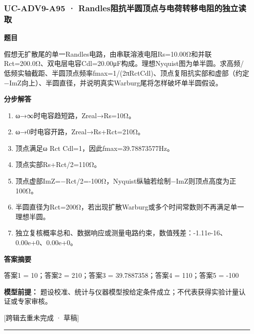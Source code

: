 \documentclass[UTF8,11pt,a4paper]{ctexart}
\begin{document}
\subsubsection*{UC-ADV9-A95 · Randles阻抗半圆顶点与电荷转移电阻的独立读取}
\noindent\textbf{题目}\par
假想无扩散尾的单一Randles电路，由串联溶液电阻Rs=10.00Ω和并联Rct=200.0Ω、双电层电容Cdl=20.00μF构成。理想Nyquist图为单半圆。求高频/低频实轴截距、半圆顶点频率fmax=1/(2πRctCdl)、顶点复阻抗实部和虚部（约定−ImZ向上）、半圆直径，并说明真实Warburg尾将怎样破坏单半圆假设。\par
\medskip\noindent\textbf{分步解答}
\begin{enumerate}
\item ω→∞时电容趋短路，Zreal→Rs=10Ω。
\item ω→0时电容开路，Zreal→Rs+Rct=210Ω。
\item 顶点满足ω Rct Cdl=1，因此fmax=39.78873577Hz。
\item 顶点实部Rs+Rct/2=110Ω。
\item 顶点虚部ImZ=−Rct/2=-100Ω，Nyquist纵轴若绘制−ImZ则顶点高度为正100Ω。
\item 半圆直径为Rct=200Ω，若出现扩散Warburg或多个时间常数则不再满足单一理想半圆。
\item 独立复核概率总和、数据响应或测量电路约束，数值残差：-1.11e-16、0.00e+0、0.00e+0。
\end{enumerate}
\noindent\textbf{答案摘要}\par
答案1 = 10；答案2 = 210；答案3 = 39.7887358；答案4 = 110；答案5 = -100\par
\noindent\textbf{模型前提：}
题设校准、统计与仪器模型按给定条件成立；不代表获得实验计量认证或专家审核。\par
\noindent\textcolor{red!65!black}{[跨辑去重未完成 · 草稿]} \par
\medskip\hrule\medskip
{}
\end{document}
